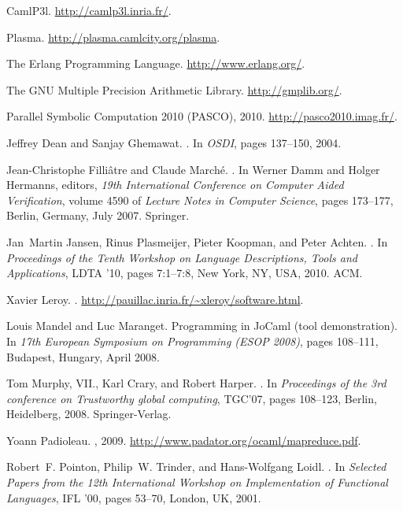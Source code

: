 \documentclass{llncs}
\begin{document}
%
%
\begin{thebibliography}{10}

{CamlP3l}.
\newblock \url{http://camlp3l.inria.fr/}.

{Plasma}.
\newblock \url{http://plasma.camlcity.org/plasma}.

{The Erlang Programming Language}.
\newblock \url{http://www.erlang.org/}.

{The GNU Multiple Precision Arithmetic Library}.
\newblock \url{http://gmplib.org/}.

{Parallel Symbolic Computation 2010 (PASCO)}, 2010.
\newblock \url{http://pasco2010.imag.fr/}.

Jeffrey Dean and Sanjay Ghemawat.
.
\newblock In {\em OSDI}, pages 137--150, 2004.

Jean-Christophe Filli\^atre and Claude March\'e.
.
\newblock In Werner Damm and Holger Hermanns, editors, {\em 19th International
  Conference on Computer Aided Verification}, volume 4590 of {\em Lecture Notes
  in Computer Science}, pages 173--177, Berlin, Germany, July 2007. Springer.

Jan~Martin Jansen, Rinus Plasmeijer, Pieter Koopman, and Peter Achten.
.
\newblock In {\em Proceedings of the Tenth Workshop on Language Descriptions,
  Tools and Applications}, LDTA '10, pages 7:1--7:8, New York, NY, USA, 2010.
  ACM.

Xavier Leroy.
.
\newblock \url{http://pauillac.inria.fr/~xleroy/software.html}.

Louis Mandel and Luc Maranget.
\newblock Programming in {JoCaml} (tool demonstration).
\newblock In {\em 17th European Symposium on Programming ({ESOP 2008})}, pages
  108--111, Budapest, Hungary, April 2008.

Tom Murphy, VII., Karl Crary, and Robert Harper.
.
\newblock In {\em Proceedings of the 3rd conference on Trustworthy global
  computing}, TGC'07, pages 108--123, Berlin, Heidelberg, 2008.
  Springer-Verlag.

Yoann Padioleau.
, 2009.
\newblock \url{http://www.padator.org/ocaml/mapreduce.pdf}.

Robert~F. Pointon, Philip~W. Trinder, and Hans-Wolfgang Loidl.
.
\newblock In {\em Selected Papers from the 12th International Workshop on
  Implementation of Functional Languages}, IFL '00, pages 53--70, London, UK,
  2001.

\end{thebibliography}
\end{document}
